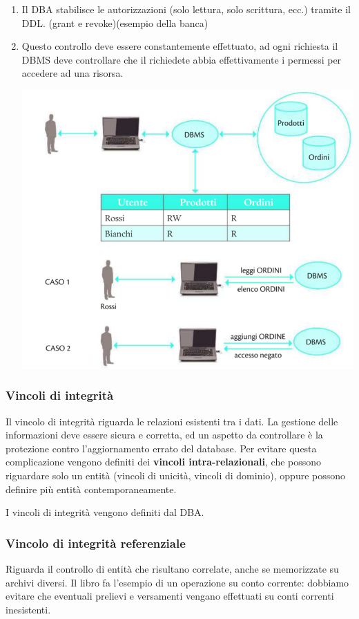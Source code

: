 \documentclass{article}
\begin{document}
\begin{enumerate}
    \item Il DBA stabilisce le autorizzazioni (solo lettura, solo scrittura, ecc.) tramite il DDL. (grant e revoke)(esempio della banca)
    \item Questo controllo deve essere constantemente effettuato, ad ogni richiesta il DBMS deve controllare che il richiedete abbia effettivamente i permessi per accedere ad una risorsa.
\begin{center}
    \includegraphics[h, scale=0.8]{privatezza.PNG}
\end{center}

\end{enumerate}

\subsubsection{Vincoli di integrità}
Il vincolo di integrità riguarda le relazioni esistenti tra i dati. La gestione delle informazioni deve essere sicura e corretta, ed un aspetto da controllare è la protezione contro l'aggiornamento errato del database. Per evitare questa complicazione vengono definiti dei \textbf{vincoli intra-relazionali}, che possono riguardare solo un entità (vincoli di unicità, vincoli di dominio), oppure possono definire più entità contemporaneamente.

I vincoli di integrità vengono definiti dal DBA.

\subsubsection{Vincolo di integrità referenziale}
Riguarda il controllo di entità che risultano correlate, anche se memorizzate su archivi diversi.
Il libro fa l'esempio di un operazione su conto corrente: dobbiamo evitare che eventuali prelievi e versamenti vengano effettuati su conti correnti inesistenti. 
\end{document}
